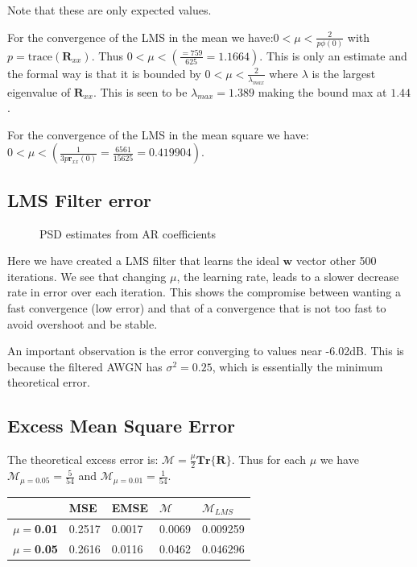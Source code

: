 \documentclass[10pt,twoside,a4paper]{report}
\begin{document}
 Note that these are only expected values.
 
 For the convergence of the LMS in the mean we have:$ 0 < \mu <	\frac{2}{p \phi(0)}$ with $p=\text{trace}(\mathbf{R} _{xx})$. Thus $ 0 < \mu <(	\frac{=759}{625} = 1.1664)$. This is only an estimate and the formal way is that it is bounded by $0<\mu <\frac{2}{\lambda_{max}}$ where $\lambda$ is the largest eigenvalue of $\mathbf{R} _{xx}$. This is seen to be $\lambda_{max}=1.389$ making the bound max at $1.44$.
 
  For the convergence of the LMS in the mean square we have: $0 < \mu < (\frac{1}{3 p \mathbf{r}_{xx}(0)} = \frac{6561}{15625} = 0.419904)$.
    \FloatBarrier
  \subsection{LMS Filter error}
  \FloatBarrier
\begin{figure}[h!]
\centering
\resizebox{\textwidth}{!}{}
\caption{PSD estimates from AR coefficients}
\label{fig:3_1b}
\end{figure}
 
Here we have created a LMS filter that learns the ideal $\mathbf{w}$ vector other 500 iterations. We see that changing $\mu$, the learning rate, leads to a slower decrease rate in error over each iteration. This shows the compromise between wanting a fast convergence (low error) and that of a convergence that is not too fast to avoid overshoot and be stable.

An important observation is the error converging to values near -6.02dB. This is because the filtered AWGN has $\sigma^2 = 0.25$, which is essentially the minimum theoretical error.


\subsection{Excess Mean Square Error}

The theoretical excess error is: $\mathcal{M}=\frac{\mu}{2}\mathbf{Tr}\{\mathbf{R} \}$. Thus for each $\mu$ we have $\mathcal{M}_{\mu=0.05}= \frac{5}{54}$ and $\mathcal{M}_{\mu=0.01}= \frac{1}{54}$.


\begin{table}[h]
\begin{tabular}{|l|l|l|l|l|}
\hline
  & \textbf{MSE} & \textbf{EMSE} & \textbf{$\mathcal{M}$} & \textbf{$\mathcal{M}_{LMS}$} \\ \hline
\textbf{$\mu = $0.01} & 0.2517       & 0.0017        & 0.0069         & 0.009259             \\ \hline
\textbf{$\mu = $0.05} & 0.2616       & 0.0116        & 0.0462         & 0.046296             \\ \hline
\end{tabular}
\end{table}
\end{document}
